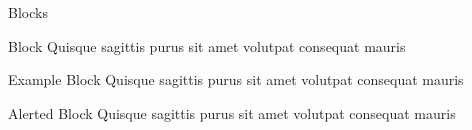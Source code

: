 \documentclass[aspectratio=169, 12pt]{beamer} %
\begin{document}
  \begin{frame}{Blocks}
    \begin{block}{Block}
      Quisque sagittis purus sit amet volutpat consequat mauris
    \end{block}

    \begin{exampleblock}{Example Block}
      Quisque sagittis purus sit amet volutpat consequat mauris
     
    \end{exampleblock}

    \begin{alertblock}{Alerted Block}
      Quisque sagittis purus sit amet volutpat consequat mauris      
    \end{alertblock}
  \end{frame}
  
  \begin{frame}[plain]
    \questionspage
  \end{frame}

  \begin{frame}[plain]
    \thankyoupage
  \end{frame}
\end{document}
